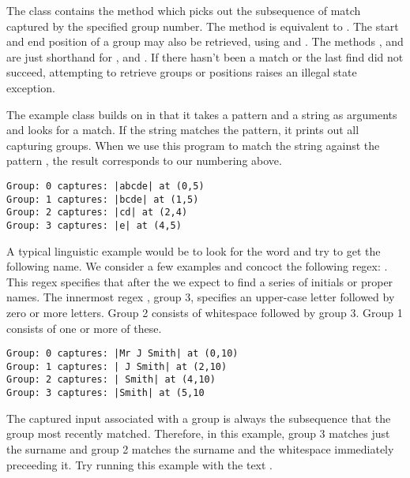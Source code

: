 The  class contains the method
 which picks out the subsequence of match captured by the
specified group number.
The  method is equivalent to .
The start and end position of a group may also be
retrieved, using  and .
The methods , and  
are just shorthand for
, and .
If there hasn't been a match or the last find did not succeed, attempting to retrieve
groups or positions raises an illegal state exception.

The example class  builds on 
in that it takes a pattern and a string as arguments and looks for a match.
If the string matches the pattern, it prints out all capturing groups.
%
%
%
When we use this program to match the string  against the pattern ,
the result corresponds to our numbering above.
%
\begin{verbatim}
Group: 0 captures: |abcde| at (0,5)
Group: 1 captures: |bcde| at (1,5)
Group: 2 captures: |cd| at (2,4)
Group: 3 captures: |e| at (4,5)
\end{verbatim}
%

A typical linguistic example would be to look for the word 
and try to get the following name.
We consider a few examples and concoct the following regex:
.
This regex specifies that after the  we expect to find
a series of initials or proper names.
The innermost regex , group 3,
specifies an upper-case letter followed by zero or more letters.
Group 2 consists of whitespace followed by group 3.
Group 1 consists of one or more of these.
%
\begin{verbatim}
Group: 0 captures: |Mr J Smith| at (0,10)
Group: 1 captures: | J Smith| at (2,10)
Group: 2 captures: | Smith| at (4,10)
Group: 3 captures: |Smith| at (5,10
\end{verbatim}
%
The captured input associated with a group is always the subsequence that the group most recently matched.
Therefore, in this example, group 3 matches just the surname
and group 2 matches the surname and the whitespace immediately preceeding it.
Try running this example with the text .

